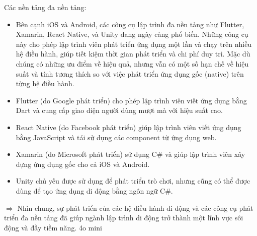     \begin{flushleft}
      \hspace*{0.8cm}Các nền tảng đa nền tảng:
      \setlength{\leftmargini}{1.5cm}
      \begin{itemize}
          \item Bên cạnh iOS và Android, các công cụ lập trình đa nền tảng như Flutter, Xamarin, React Native, và Unity đang ngày càng phổ biến. Những công cụ này cho phép lập trình viên phát triển ứng dụng một lần và chạy trên nhiều hệ điều hành, giúp tiết kiệm thời gian phát triển và chi phí duy trì. Mặc dù chúng có những ưu điểm về hiệu quả, nhưng vẫn có một số hạn chế về hiệu suất và tính tương thích so với việc phát triển ứng dụng gốc (native) trên từng hệ điều hành.
          \item Flutter (do Google phát triển) cho phép lập trình viên viết ứng dụng bằng Dart và cung cấp giao diện người dùng mượt mà với hiệu suất cao.
          \item React Native (do Facebook phát triển) giúp lập trình viên viết ứng dụng bằng JavaScript và tái sử dụng các component từ ứng dụng web.
          \item Xamarin (do Microsoft phát triển) sử dụng C\# và giúp lập trình viên xây dựng ứng dụng gốc cho cả iOS và Android.
          \item Unity chủ yếu được sử dụng để phát triển trò chơi, nhưng cũng có thể được dùng để tạo ứng dụng di động bằng ngôn ngữ C\#.
      \end{itemize}
    \end{flushleft}

    \begin{flushleft}
      \hspace*{0.8cm}$\Rightarrow$ Nhìn chung, sự phát triển của các hệ điều hành di động và các công cụ phát triển đa nền tảng đã giúp ngành lập trình di động trở thành một lĩnh vực sôi động và đầy tiềm năng.
      4o mini	
    \end{flushleft}